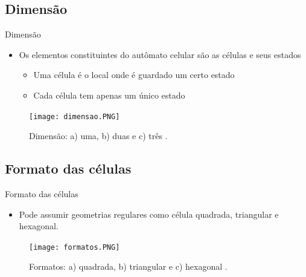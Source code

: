 \documentclass[compress, hide notes]{beamer}
\begin{document}
\subsection{Dimensão}
\begin{frame}{Dimensão \cite{ufmg}}
	
	\begin{itemize}
 		\setlength\itemsep{12pt}
		
		\item Os elementos constituintes do autômato celular são as células e seus estados
		\begin{itemize}		
 		\setlength\itemsep{6pt}
          \item Uma célula é o local onde é guardado um certo estado

          \item Cada célula tem apenas um único estado
		\end{itemize}
	\end{itemize}
	
	\begin{figure}[h]
		\center
		\texttt{[image: dimensao.PNG]}
		\caption{Dimensão: a) uma, b) duas e c) três \cite{ufmg}.}
	\end{figure}
\end{frame}
	
    
\subsection{Formato das células}
\begin{frame}{Formato das células \cite{ufmg}}
	
	\begin{itemize}
		\item Pode assumir geometrias regulares como célula quadrada, triangular e hexagonal.
	\end{itemize}
	
	\begin{figure}[h]
		\center
		\texttt{[image: formatos.PNG]}
		\caption{Formatos: a) quadrada, b) triangular e c) hexagonal \cite{ufmg}.}
	\end{figure}
		
\end{frame}	
\end{document}
